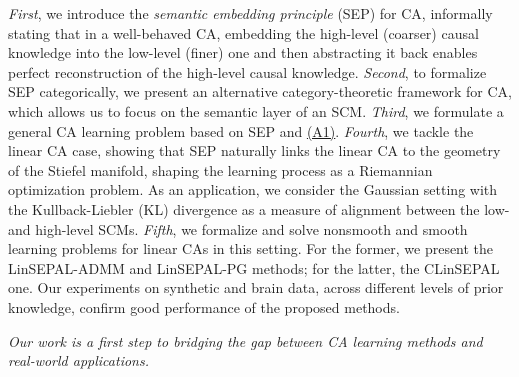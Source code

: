  \emph{First}, we introduce the \emph{semantic embedding principle} (SEP) for CA, informally stating that in a well-behaved CA, embedding the high-level (coarser) causal knowledge into the low-level (finer) one and then abstracting it back enables perfect reconstruction of the high-level causal knowledge.
\emph{Second}, to formalize SEP categorically, we present an alternative category-theoretic framework for CA, which allows us to focus on the semantic layer of an SCM. 
\emph{Third}, we formulate a general CA learning problem based on SEP and \hyperlink{(A1)}{(A1)}.
\emph{Fourth}, we tackle the linear CA case, showing that SEP naturally links the linear CA to the geometry of the Stiefel manifold, shaping the learning process as a Riemannian optimization problem.
As an application, we consider the Gaussian setting with the Kullback-Liebler (KL) divergence as a measure of alignment between
the low- and high-level SCMs.
\emph{Fifth}, we formalize and solve nonsmooth and smooth learning problems for linear CAs in this setting. For the former, we present the LinSEPAL-ADMM and LinSEPAL-PG methods; for the latter, the CLinSEPAL one.
Our experiments on synthetic and brain data, across different levels of prior knowledge, confirm good performance of the proposed methods.

\emph{Our work is a first step to bridging the gap between CA learning methods and real-world applications.}